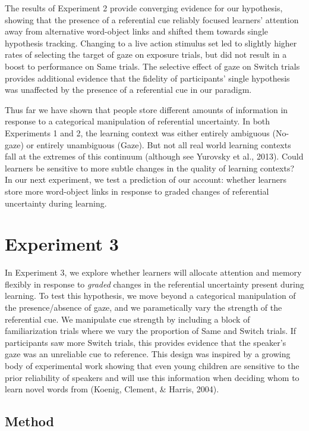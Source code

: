 \documentclass[authoryear, review]{elsarticle}
\begin{document}
The results of Experiment 2 provide converging evidence for our
hypothesis, showing that the presence of a referential cue reliably
focused learners' attention away from alternative word-object links and
shifted them towards single hypothesis tracking. Changing to a live
action stimulus set led to slightly higher rates of selecting the target
of gaze on exposure trials, but did not result in a boost to performance
on Same trials. The selective effect of gaze on Switch trials provides
additional evidence that the fidelity of participants' single hypothesis
was unaffected by the presence of a referential cue in our paradigm.

Thus far we have shown that people store different amounts of
information in response to a categorical manipulation of referential
uncertainty. In both Experiments 1 and 2, the learning context was
either entirely ambiguous (No-gaze) or entirely unambiguous (Gaze). But
not all real world learning contexts fall at the extremes of this
continuum (although see Yurovsky et al., 2013). Could learners be
sensitive to more subtle changes in the quality of learning contexts? In
our next experiment, we test a prediction of our account: whether
learners store more word-object links in response to graded changes of
referential uncertainty during learning.

\section{Experiment 3}\label{experiment-3}

In Experiment 3, we explore whether learners will allocate attention and
memory flexibly in response to \emph{graded} changes in the referential
uncertainty present during learning. To test this hypothesis, we move
beyond a categorical manipulation of the presence/absence of gaze, and
we parametically vary the strength of the referential cue. We manipulate
cue strength by including a block of familiarization trials where we
vary the proportion of Same and Switch trials. If participants saw more
Switch trials, this provides evidence that the speaker's gaze was an
unreliable cue to reference. This design was inspired by a growing body
of experimental work showing that even young children are sensitive to
the prior reliability of speakers and will use this information when
deciding whom to learn novel words from (Koenig, Clement, \& Harris,
2004).

\subsection{Method}\label{method-2}
\end{document}

